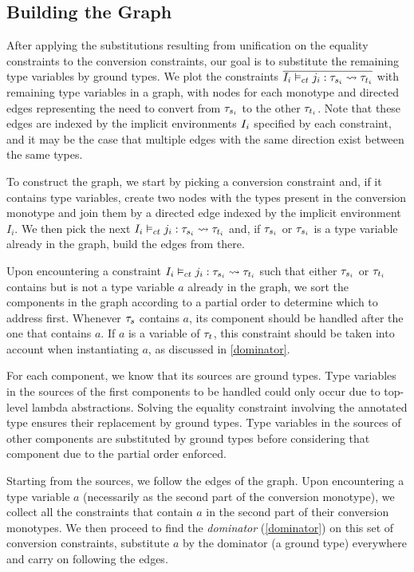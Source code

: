 \subsection{Building the Graph}
\label{graph}
After applying the substitutions resulting from unification on the equality constraints to the conversion constraints, our goal is to substitute the remaining type variables by ground types. We plot the constraints $\overline{{I_i} \vDash_{ct} {j_i}: {\mathit{\tau}_{s_i}} \rightsquigarrow {\mathit{\tau}_{t_i}}}$ with remaining type variables in a graph, with nodes for each monotype and directed edges representing the need to convert from $\mathit{\tau}_{s_i}$ to the other $\mathit{\tau}_{t_i}$. Note that these edges are indexed by the implicit environments $I_i$ specified by each constraint, and it may be the case that multiple edges with the same direction exist between the same types.

To construct the graph, we start by picking a conversion constraint and, if it contains type variables, create two nodes with the types present in the conversion monotype and join them by a directed edge indexed by the implicit environment $I_i$. We then pick the next ${I_i} \vDash_{ct} {j_i}: {\mathit{\tau}_{s_i}} \rightsquigarrow {\mathit{\tau}_{t_i}}$ and, if $\mathit{\tau}_{s_i}$ or $\mathit{\tau}_{s_i}$ is a type variable already in the graph, build the edges from there.

Upon encountering a constraint ${I_i} \vDash_{ct} {j_i}: {\mathit{\tau}_{s_i}} \rightsquigarrow {\mathit{\tau}_{t_i}}$ such that either $\mathit{\tau}_{s_i}$ or $\mathit{\tau}_{t_i}$ contains but is not a type variable $a$ already in the graph, we sort the components in the graph according to a partial order to determine which to address first. Whenever  $\mathit{\tau}_s$ contains $a$, its component should be handled after the one that contains $a$. If $a$ is a variable of $\mathit{\tau}_t$, this constraint should be taken into account when instantiating $a$, as discussed in \ref{dominator}. 

For each component, we know that its sources are ground types. Type variables in the sources of the first components to be handled could only occur due to top-level lambda abstractions. Solving the equality constraint involving the annotated type ensures their replacement by ground types. Type variables in the sources of other components are substituted by ground types before considering that component due to the partial order enforced.

Starting from the sources, we follow the edges of the graph. Upon encountering a type variable $a$ (necessarily as the second part of the conversion monotype), we collect all the constraints that contain $a$ in the second part of their conversion monotypes. We then proceed to find the \textit{dominator} (\ref{dominator}) on this set of conversion constraints, substitute $a$ by the dominator (a ground type) everywhere and carry on following the edges.

